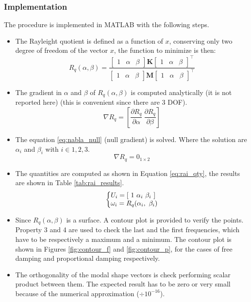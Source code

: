 \documentclass[twosided,a4paper]{article}           %
\makeatletter
\newcommand{\tr}{^{{\bm \top}}}
\newenvironment{sistema}%
{\left\lbrace\begin{array}{@{}l@{}}}%
	{\end{array}\right.}
\makeatother
\begin{document}
\subsubsection{Implementation}
The procedure is implemented in MATLAB with the following steps.
\begin{itemize}
	\item The Rayleight quotient is defined as a function of $x$, conserving only two degree of freedom of the vector $x$, the function to minimize is then:
	\begin{equation}
		R_q(\alpha,\beta) = \dfrac{\begin{bmatrix} 1 & \alpha & \beta \end{bmatrix}   \bm{K}
		                    \begin{bmatrix} 1 & \alpha & \beta \end{bmatrix} \tr}{\begin{bmatrix} 1 & \alpha & \beta \end{bmatrix} \bm{M}
		                    \begin{bmatrix} 1 & \alpha & \beta \end{bmatrix} \tr}
	\end{equation}
	\item The gradient in $\alpha$ and $\beta$ of $R_q(\alpha,\beta)$ is computed analytically (it is not reported here)  (this is convenient since there are 3 DOF).
	\begin{equation}
		\nabla R_q = \left [ \dfrac{\partial R_q}{\partial \alpha} \ \dfrac{\partial R_q}{\partial \beta} \right ]
	\end{equation}
	\item The equation \eqref{eq:nabla_null} (null gradient) is solved. Where the solution are $\alpha_i$ and $\beta_i$ with $i \in 1,2,3$. 
	\begin{equation}
	\label{eq:nabla_null}
		\nabla R_q = 0_{1 \times 2}
	\end{equation}
	\item The quantities are computed as shown in Equation \eqref{eq:rai_qty}, the results are shown in Table \ref{tab:rai_results}.
	\begin{equation}
	\label{eq:rai_qty}
		\begin{sistema}
		U_i = \left [ \ 1 \ \alpha_i \ \beta_i \ \right ]\\
		\omega_i = R_q(\alpha_i, \ \beta_i)
		\end{sistema}
	\end{equation}
	\item Since $R_q(\alpha,\beta)$ is a surface. A contour plot is provided to verify the points. Property 3 and 4 are used to check the last and the first frequencies, which have to be respectively a maximum and a minimum. The contour plot is shown in Figures \ref{fig:contour_f} and \ref{fig:contour_p}, for the cases of free damping and proportional damping respectively.
	\item The orthogonality of the modal shape vectors is check performing scalar product between them. The expected result has to be zero or very small because of the numerical approximation ($\div 10^{-16}$).
	

\end{itemize}
\end{document}
